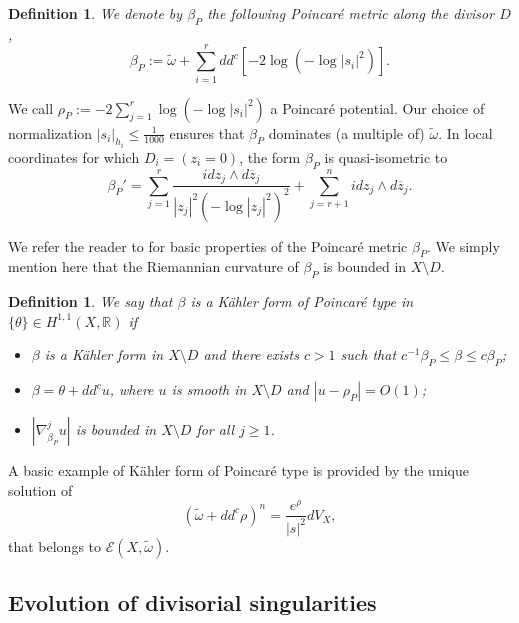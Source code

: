 \documentclass[10pt,a4paper]{amsart}
\numberwithin{equation}{section}
\newtheorem{defi}[theorem]{Definition}
\newcommand{\R}{\mathbb R}
\newcommand{\f}{\varphi}
\begin{document}
\begin{defi}
 We denote by $\beta_P$ the following Poincaré metric along the divisor $D$,
 $$
 \beta_P:=\tilde{\omega} + \sum_{i=1}^r  dd^c [-2 \log(-\log |s_i|^2)].
 $$
\end{defi}

We call $\rho_P:=-2\sum_{j=1}^r \log(-\log |s_i|^2)$ a Poincar\'e potential.
 Our choice of normalization $|s_i|_{h_i} \leq \frac{1}{1000}$ ensures that 
 $\beta_P$ dominates (a multiple of) $\tilde{\omega}$. In local coordinates
 for which  $D_i=(z_i=0)$, the form $\beta_P$ is quasi-isometric to
 $$
 \beta_P'=\sum_{j=1}^r \frac{id z_j \wedge d\overline{z}_j}{|z_j|^2 (-\log |z_j|^2)^2}
 +\sum_{j=r+1}^n id z_j \wedge d\overline{z}_j.
 $$
 
 
We refer the reader to \cite{Kob84} for basic properties of the Poincaré metric $\beta_P$. 
 We simply mention here that the Riemannian curvature of $\beta_P$ is bounded in $X \setminus D$.
 

 \begin{defi}
  We say that $\beta$ is a K\"ahler form of Poincaré type
 in $\{ {\theta}\} \in H^{1,1}(X,\R)$ if 
 \begin{itemize}
 \item $\beta$ is a K\"ahler form in $X \setminus D$ and there exists $c>1$ such that $c^{-1} \beta_P \leq \beta \leq c \beta_P$;
 \item $\beta=\theta+dd^c u$, where $u$ is smooth in $X\setminus D$ and $|u-\rho_P|=O(1)$;
 \item $\left| \nabla_{\beta_P}^j u \right|$ is bounded in $X \setminus D$ for all $j \geq 1$.
 \end{itemize}
 \end{defi}
 
 A basic example of K\"ahler form of Poincaré type is provided by the unique solution of 
 $$
 (\tilde{\omega}+dd^c \rho)^n=\frac{e^{\rho}}{|s|^2} dV_X,
 $$
 that belongs to $\mathcal{E}(X,\tilde{\omega})$.
  
 
 





\subsection{Evolution of divisorial singularities}
\end{document}
